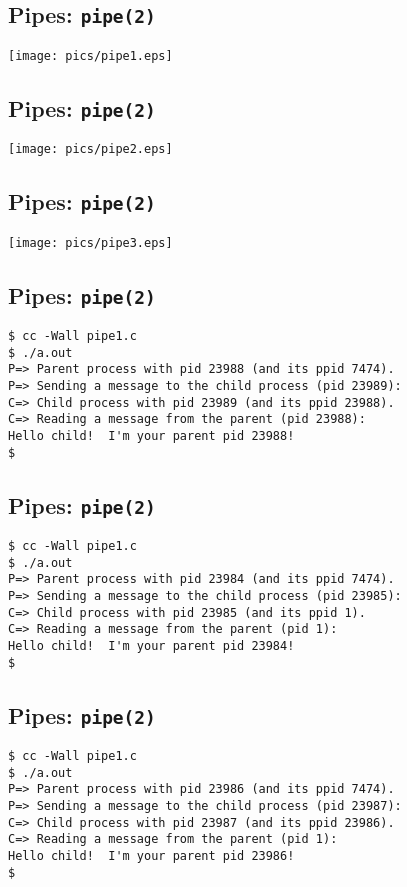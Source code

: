 \documentclass[xga]{xdvislides}
\begin{document}
\subsection{Pipes: {\tt pipe(2)}}
\begin{center}
	\texttt{[image: pics/pipe1.eps]}
\end{center}

\subsection{Pipes: {\tt pipe(2)}}
\begin{center}
	\texttt{[image: pics/pipe2.eps]}
\end{center}

\subsection{Pipes: {\tt pipe(2)}}
\begin{center}
	\texttt{[image: pics/pipe3.eps]}
\end{center}

\subsection{Pipes: {\tt pipe(2)}}
\begin{verbatim}
$ cc -Wall pipe1.c
$ ./a.out
P=> Parent process with pid 23988 (and its ppid 7474).
P=> Sending a message to the child process (pid 23989):
C=> Child process with pid 23989 (and its ppid 23988).
C=> Reading a message from the parent (pid 23988):
Hello child!  I'm your parent pid 23988!
$
\end{verbatim}
\vfill


\subsection{Pipes: {\tt pipe(2)}}
\begin{verbatim}
$ cc -Wall pipe1.c
$ ./a.out
P=> Parent process with pid 23984 (and its ppid 7474).
P=> Sending a message to the child process (pid 23985):
C=> Child process with pid 23985 (and its ppid 1).
C=> Reading a message from the parent (pid 1):
Hello child!  I'm your parent pid 23984!
$
\end{verbatim}
\vfill

\subsection{Pipes: {\tt pipe(2)}}
\begin{verbatim}
$ cc -Wall pipe1.c
$ ./a.out
P=> Parent process with pid 23986 (and its ppid 7474).
P=> Sending a message to the child process (pid 23987):
C=> Child process with pid 23987 (and its ppid 23986).
C=> Reading a message from the parent (pid 1):
Hello child!  I'm your parent pid 23986!
$
\end{verbatim}
\vfill
\end{document}
